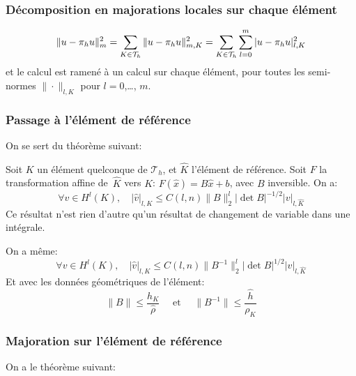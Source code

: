 \medskip
\subsubsection{Décomposition en majorations locales sur chaque élément}

\begin{equation}
\|u-\pi_hu\|^2_m=\displaystyle\sum_{K\in\mathcal{T}_h}\|u-\pi_hu\|^2_{m,K}=\displaystyle\sum_{K\in\mathcal{T}_h}\displaystyle\sum_{l=0}^m |u-\pi_hu|^2_{l,K}
\end{equation}
et le calcul est ramené à un calcul sur chaque élément, pour toutes les semi-normes
$\|\cdot\|_{l,K}$ pour $l=0$,\ldots, $m$.

\medskip
\subsubsection{Passage à l'élément de référence}

On se sert du théorème suivant:

\begin{theoreme}
Soit $K$ un élément quelconque de $\mathcal{T}_h$, et $\hat{K}$ l'élément de
référence. Soit $F$ la transformation affine de~$\hat{K}$ vers $K$:
$F(\hat{x}) = B\hat{x} + b$, avec $B$ inversible. On a:
\begin{equation}
\forall v\in H^l(K), \quad
|\hat{v}|_{l,K} \le C(l,n) \|B\|_2^l |\det B|^{-1/2} |v|_{l,\hat{K}}
\end{equation}
Ce résultat n'est rien d'autre qu'un résultat de changement de variable
dans une intégrale.
\end{theoreme}
On a même:
\begin{equation}
\forall v\in H^l(K), \quad
|\hat{v}|_{l,K} \le C(l,n) \|B^{-1}\|_2^l |\det B|^{1/2} |v|_{l,\hat{K}}
\end{equation}
\medskip
%
Et avec les données géométriques de l'élément:
\begin{equation}
\|B\|\le\dfrac{h_K}{\hat{\rho}} \quad\text{ et }\quad
\|B^{-1}\|\le\dfrac{\hat{h}}{\rho_K}
\end{equation}

\medskip
\subsubsection{Majoration sur l'élément de référence}
On a le théorème suivant:

